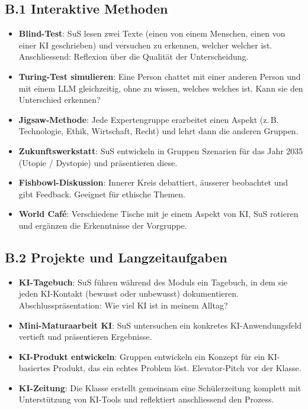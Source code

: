 \subsection*{B.1 Interaktive Methoden}

\begin{itemize}
    \item \textbf{Blind-Test}: SuS lesen zwei Texte (einen von einem Menschen,
          einen von einer KI geschrieben) und versuchen zu erkennen, welcher welcher ist.
          Anschliessend: Reflexion über die Qualität der Unterscheidung.
    \item \textbf{Turing-Test simulieren}: Eine Person chattet mit einer
          anderen Person und mit einem LLM gleichzeitig, ohne zu wissen,
          welches welches ist. Kann sie den Unterschied erkennen?
    \item \textbf{Jigsaw-Methode}: Jede Expertengruppe erarbeitet einen
          Aspekt (z.\,B. Technologie, Ethik, Wirtschaft, Recht) und lehrt
          dann die anderen Gruppen.
    \item \textbf{Zukunftswerkstatt}: SuS entwickeln in Gruppen Szenarien
          für das Jahr 2035 (Utopie / Dystopie) und präsentieren diese.
    \item \textbf{Fishbowl-Diskussion}: Innerer Kreis debattiert, äusserer
          beobachtet und gibt Feedback. Geeignet für ethische Themen.
    \item \textbf{World Café}: Verschiedene Tische mit je einem Aspekt
          von KI, SuS rotieren und ergänzen die Erkenntnisse der Vorgruppe.
\end{itemize}

\subsection*{B.2 Projekte und Langzeitaufgaben}

\begin{itemize}
    \item \textbf{KI-Tagebuch}: SuS führen während des Moduls ein Tagebuch,
          in dem sie jeden KI-Kontakt (bewusst oder unbewusst) dokumentieren.
          Abschlusspräsentation: Wie viel KI ist in meinem Alltag?
    \item \textbf{Mini-Maturaarbeit KI}: SuS untersuchen ein konkretes
          KI-Anwendungsfeld vertieft und präsentieren Ergebnisse.
    \item \textbf{KI-Produkt entwickeln}: Gruppen entwickeln ein Konzept
          für ein KI-basiertes Produkt, das ein echtes Problem löst.
          Elevator-Pitch vor der Klasse.
    \item \textbf{KI-Zeitung}: Die Klasse erstellt gemeinsam eine
          Schülerzeitung komplett mit Unterstützung von KI-Tools
          und reflektiert anschliessend den Prozess.
\end{itemize}

